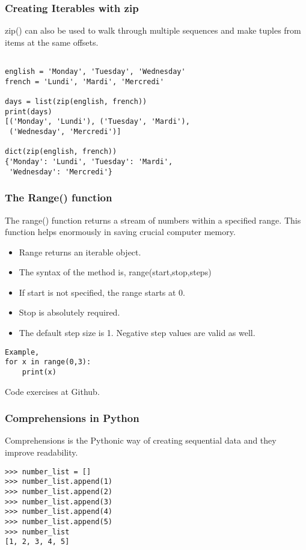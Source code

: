 \documentclass{beamer}
\begin{document}
\begin{frame}[fragile]
\frametitle{Creating Iterables with zip}
zip() can also be used to walk through multiple sequences and make tuples from items at the same offsets.
\begin{lstlisting}	

english = 'Monday', 'Tuesday', 'Wednesday'
french = 'Lundi', 'Mardi', 'Mercredi'

days = list(zip(english, french))
print(days)
[('Monday', 'Lundi'), ('Tuesday', 'Mardi'),
 ('Wednesday', 'Mercredi')]

dict(zip(english, french))
{'Monday': 'Lundi', 'Tuesday': 'Mardi',
 'Wednesday': 'Mercredi'}
\end{lstlisting}

\end{frame}

\begin{frame}[fragile]
\frametitle{The Range() function}
The range() function returns a stream of numbers within a specified range. This function helps enormously in saving crucial computer memory.
\begin{itemize}
\item Range returns an iterable object.
\item The syntax of the method is, range(start,stop,steps)
\item If start is not specified, the range starts at 0.
\item Stop is absolutely required.
\item The default step size is 1. Negative step values are valid as well.
\end{itemize}
\begin{lstlisting}
Example,
for x in range(0,3):
	print(x)

\end{lstlisting}
	
Code exercises at Github.
\end{frame}

\begin{frame}[fragile]
\frametitle{Comprehensions in Python}
Comprehensions is the Pythonic way of creating sequential data and they improve readability.
\begin{lstlisting}
>>> number_list = []
>>> number_list.append(1)
>>> number_list.append(2)
>>> number_list.append(3)
>>> number_list.append(4)
>>> number_list.append(5)
>>> number_list
[1, 2, 3, 4, 5]
\end{lstlisting}
\end{frame}
\end{document}
